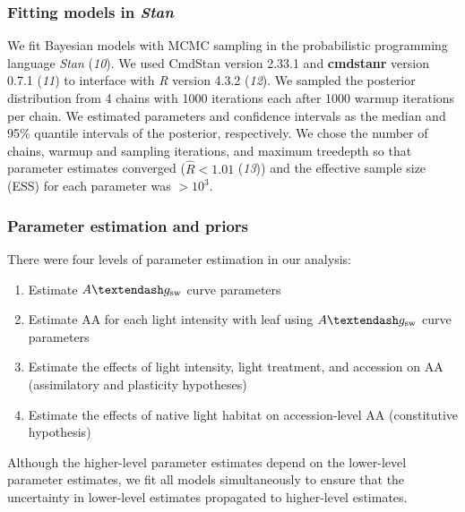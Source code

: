\documentclass[
  letterpaper,
  DIV=11,
  numbers=noendperiod]{scrartcl}
\providecommand{\tightlist}{%
  \setlength{\itemsep}{0pt}\setlength{\parskip}{0pt}}\usepackage{longtable,booktabs,array}
\newcommand{\aax}{$\mathrm{AA}$}
\newcommand{\agcurve}{$A \textendash g_\text{sw}$}
\begin{document}
\subsubsection{\texorpdfstring{Fitting models in
\emph{Stan}}{Fitting models in Stan}}\label{sec-fitting}

We fit Bayesian models with MCMC sampling in the probabilistic
programming language \emph{Stan} (\emph{10}). We used CmdStan version
2.33.1 and \textbf{cmdstanr} version 0.7.1 (\emph{11}) to interface with
\emph{R} version 4.3.2 (\emph{12}). We sampled the posterior
distribution from 4 chains with 1000 iterations each after 1000 warmup
iterations per chain. We estimated parameters and confidence intervals
as the median and 95\% quantile intervals of the posterior,
respectively. We chose the number of chains, warmup and sampling
iterations, and maximum treedepth so that parameter estimates converged
(\(\hat{R} < 1.01\) (\emph{13})) and the effective sample size (ESS) for
each parameter was \(> 10^3\).

\subsubsection{Parameter estimation and priors}\label{sec-parameters}

There were four levels of parameter estimation in our analysis:

\begin{enumerate}
\def\labelenumi{\arabic{enumi}.}
\tightlist
\item
  Estimate \agcurve{} curve parameters
\item
  Estimate \aax{} for each light intensity with leaf using \agcurve{}
  curve parameters
\item
  Estimate the effects of light intensity, light treatment, and
  accession on \aax{} (assimilatory and plasticity hypotheses)
\item
  Estimate the effects of native light habitat on accession-level \aax{}
  (constitutive hypothesis)
\end{enumerate}

Although the higher-level parameter estimates depend on the lower-level
parameter estimates, we fit all models simultaneously to ensure that the
uncertainty in lower-level estimates propagated to higher-level
estimates.
\end{document}
